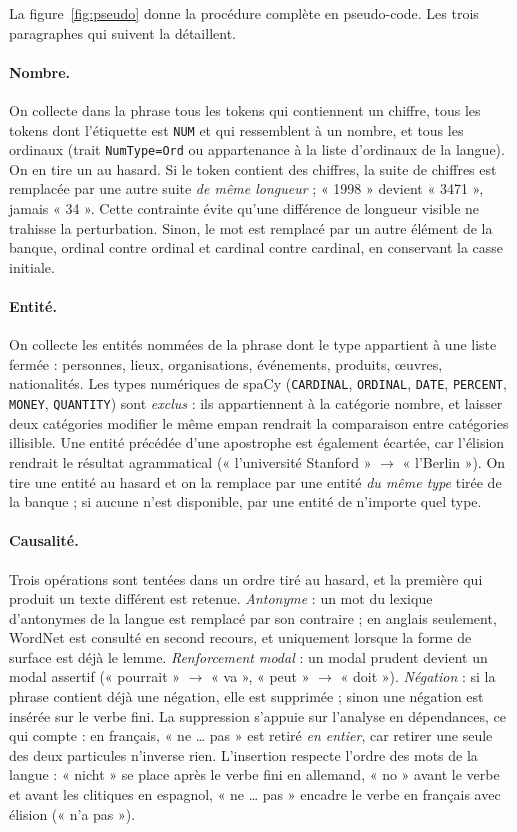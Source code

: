 \documentclass[11pt]{article}
\newcommand{\code}[1]{\texttt{\small #1}}
\begin{document}
La figure~\ref{fig:pseudo} donne la procédure complète en pseudo-code.
Les trois paragraphes qui suivent la détaillent.

\paragraph{Nombre.}
On collecte dans la phrase tous les tokens qui contiennent un chiffre, tous les tokens dont l'étiquette est \code{NUM} et qui ressemblent à un nombre, et tous les ordinaux (trait \code{NumType=Ord} ou appartenance à la liste d'ordinaux de la langue).
On en tire un au hasard.
Si le token contient des chiffres, la suite de chiffres est remplacée par une autre suite \emph{de même longueur} ; « 1998 » devient « 3471 », jamais « 34 ».
Cette contrainte évite qu'une différence de longueur visible ne trahisse la perturbation.
Sinon, le mot est remplacé par un autre élément de la banque, ordinal contre ordinal et cardinal contre cardinal, en conservant la casse initiale.

\paragraph{Entité.}
On collecte les entités nommées de la phrase dont le type appartient à une liste fermée : personnes, lieux, organisations, événements, produits, œuvres, nationalités.
Les types numériques de spaCy (\code{CARDINAL}, \code{ORDINAL}, \code{DATE}, \code{PERCENT}, \code{MONEY}, \code{QUANTITY}) sont \emph{exclus} : ils appartiennent à la catégorie nombre, et laisser deux catégories modifier le même empan rendrait la comparaison entre catégories illisible.
Une entité précédée d'une apostrophe est également écartée, car l'élision rendrait le résultat agrammatical (« l'université Stanford » $\to$ « l'Berlin »).
On tire une entité au hasard et on la remplace par une entité \emph{du même type} tirée de la banque ; si aucune n'est disponible, par une entité de n'importe quel type.

\paragraph{Causalité.}
Trois opérations sont tentées dans un ordre tiré au hasard, et la première qui produit un texte différent est retenue.
\emph{Antonyme} : un mot du lexique d'antonymes de la langue est remplacé par son contraire ; en anglais seulement, WordNet \citep{miller1995wordnet} est consulté en second recours, et uniquement lorsque la forme de surface est déjà le lemme.
\emph{Renforcement modal} : un modal prudent devient un modal assertif (« pourrait » $\to$ « va », « peut » $\to$ « doit »).
\emph{Négation} : si la phrase contient déjà une négation, elle est supprimée ; sinon une négation est insérée sur le verbe fini.
La suppression s'appuie sur l'analyse en dépendances, ce qui compte : en français, « ne \ldots{} pas » est retiré \emph{en entier}, car retirer une seule des deux particules n'inverse rien.
L'insertion respecte l'ordre des mots de la langue : « nicht » se place après le verbe fini en allemand, « no » avant le verbe et avant les clitiques en espagnol, « ne \ldots{} pas » encadre le verbe en français avec élision (« n'a pas »).
\end{document}
